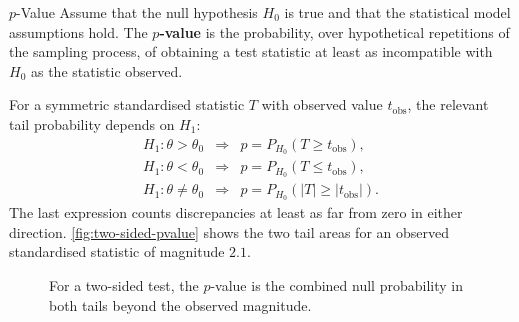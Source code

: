 \begin{definition}{$p$-Value}
Assume that the null hypothesis $H_0$ is true and that the statistical model assumptions hold. The \textbf{$p$-value} is the probability, over hypothetical repetitions of the sampling process, of obtaining a test statistic at least as incompatible with $H_0$ as the statistic observed.
\end{definition}

For a symmetric standardised statistic $T$ with observed value $t_{\mathrm{obs}}$, the relevant tail probability depends on $H_1$:
\[
\begin{array}{lll}
H_1:\theta>\theta_0
&\Longrightarrow&
p=P_{H_0}(T\geq t_{\mathrm{obs}}),\\[0.3em]
H_1:\theta<\theta_0
&\Longrightarrow&
p=P_{H_0}(T\leq t_{\mathrm{obs}}),\\[0.3em]
H_1:\theta\neq\theta_0
&\Longrightarrow&
p=P_{H_0}(|T|\geq |t_{\mathrm{obs}}|).
\end{array}
\]
The last expression counts discrepancies at least as far from zero in either direction. \autoref{fig:two-sided-pvalue} shows the two tail areas for an observed standardised statistic of magnitude $2.1$.

\begin{figure}[htbp]
\centering
{}
\caption{For a two-sided test, the $p$-value is the combined null probability in both tails beyond the observed magnitude.}
\label{fig:two-sided-pvalue}
\end{figure}

